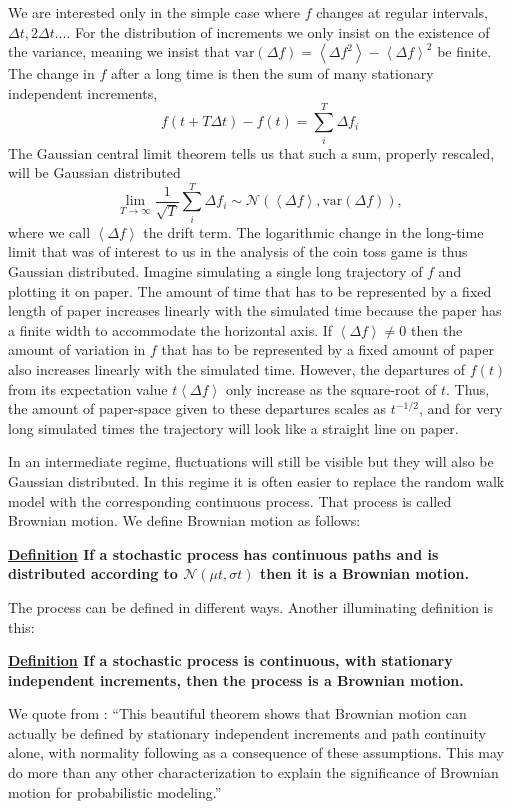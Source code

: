 \documentclass[a4paper]{article}
\newcommand{\ave}[1]{\left\langle#1 \right\rangle}
\newcommand{\var}{\text{var}}
\newcommand{\be}{\begin{equation}}
\newcommand{\ee}{\end{equation}}
\newcommand{\definition}[1]{\vspace{.2cm} {\bf \underline{Definition} #1} \vspace{.2cm}}
\begin{document}
We are interested only in the simple case where $f$ changes at regular intervals, $\Delta t, 2\Delta t ...$. For 
the distribution of increments we only insist on the existence of the variance, meaning we insist that 
$\var(\Delta f)=\ave{\Delta f^2}-\ave{\Delta f}^2$ be finite. The change in $f$ after a long time is then the sum 
of many stationary independent increments, 
\be
f(t+T\Delta t)-f(t)=\sum_i^T \Delta f_i
\ee
The Gaussian central limit theorem tells us that such a sum, properly rescaled, will be 
Gaussian distributed
\be
\lim_{T\to\infty} \frac{1}{\sqrt{T}}\sum_i^T \Delta f_i \sim \mathcal{N}(\ave{\Delta f}, \var(\Delta f)),
\ee
where we call $\ave{\Delta f}$ the drift term. The logarithmic change in the long-time limit that was 
of interest to us in the analysis of the coin toss game is thus Gaussian distributed. Imagine 
simulating a single long trajectory of $f$ and plotting it on paper. The amount of time that has 
to be represented by a fixed length of paper increases linearly with the simulated time
because the paper has a finite width to accommodate the horizontal axis. 
If $\ave{\Delta f} \neq 0$ then the amount of variation in $f$ that has to be represented by a fixed
amount of paper also increases linearly with the simulated time. However, the departures of $f(t)$ from
its expectation value $t \ave{\Delta f}$ only increase as the square-root of $t$. Thus, the 
amount of paper-space given to these departures scales as $t^{-1/2}$, and for very long simulated
times the trajectory will look like a straight line on paper.

In an intermediate regime, fluctuations will still be visible but they will also be Gaussian distributed. 
In this regime it is often easier to replace the random walk model with the corresponding continuous
process. That process is called Brownian motion. We define Brownian motion as follows:

\definition{If a stochastic process has continuous paths and is distributed according to 
$\mathcal{N}(\mu t, \sigma t)$ then it is a Brownian motion.}

The process can be defined in different ways. Another illuminating definition is this:

\definition{If a stochastic process is continuous, with stationary independent increments, then the process is a Brownian 
motion.}

We quote from \cite{Harrison2014}: ``This beautiful theorem shows that Brownian motion can actually be defined
by stationary independent increments and path continuity alone, with normality following as a consequence 
of these assumptions. This may do more than any other characterization to explain the significance of 
Brownian motion for probabilistic modeling.''
\end{document}
